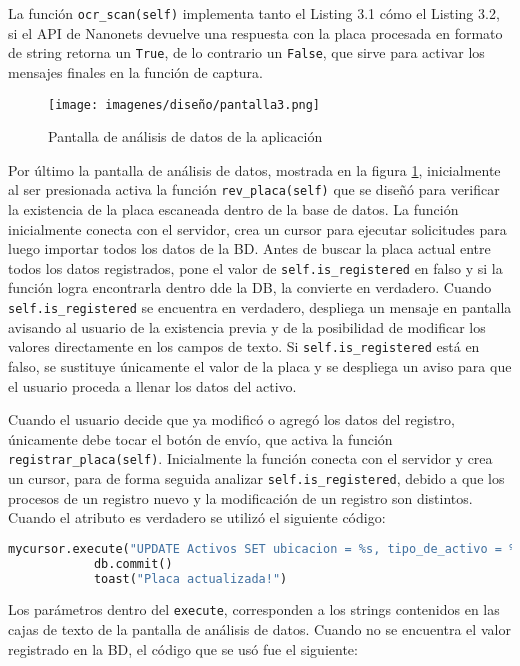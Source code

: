 La función \verb|ocr_scan(self)| implementa tanto el Listing 3.1 cómo el Listing 3.2, si el API de Nanonets devuelve una respuesta con la placa procesada en formato de string retorna un \verb|True|, de lo contrario un \verb|False|, que sirve para activar los mensajes finales en la función de captura.
\par
\begin{figure}[h!]
    \centering
    \texttt{[image: imagenes/diseño/pantalla3.png]}
    \caption{Pantalla de análisis de datos de la aplicación}
    \label{screen3}
\end{figure}
Por último la pantalla de análisis de datos, mostrada en la figura \ref{screen3}, inicialmente al ser presionada activa la función \verb|rev_placa(self)| que se diseñó para verificar la existencia de la placa escaneada dentro de la base de datos. La función inicialmente conecta con el servidor, crea un cursor para ejecutar solicitudes para luego importar todos los datos de la BD. Antes de buscar la placa actual entre todos los datos registrados, pone el valor de \verb|self.is_registered| en falso y si la función logra encontrarla dentro dde la DB, la convierte en verdadero. Cuando \verb|self.is_registered| se encuentra en verdadero, despliega un mensaje en pantalla avisando al usuario de la existencia previa y de la posibilidad de modificar los valores directamente en los campos de texto. Si \verb|self.is_registered| está en falso, se sustituye únicamente el valor de la placa y se despliega un aviso para que el usuario proceda a llenar los datos del activo.
\par
Cuando el usuario decide que ya modificó o agregó los datos del registro, únicamente debe tocar el botón de envío, que activa la función \verb|registrar_placa(self)|. Inicialmente la función conecta con el servidor y crea un cursor, para de forma seguida analizar \verb|self.is_registered|, debido a que los procesos de un registro nuevo y la modificación de un registro son distintos. Cuando el atributo es verdadero se utilizó el siguiente código:

\begin{lstlisting}[language=Python,frame=single,caption= Modificación de registro previamente existente (creación propia), inputencoding=latin1]
mycursor.execute("UPDATE Activos SET ubicacion = %s, tipo_de_activo = %s, descripcion = %s WHERE placa = %s", (self.root.ids.ubicacion.text, self.root.ids.active_type.text, self.root.ids.descrip.text, self.placa_actual))
            db.commit()
            toast("Placa actualizada!")
\end{lstlisting}
\par
Los parámetros dentro del \verb|execute|, corresponden a los strings contenidos en las cajas de texto de la pantalla de análisis de datos. Cuando no se encuentra el valor registrado en la BD, el código que se usó fue el siguiente:

